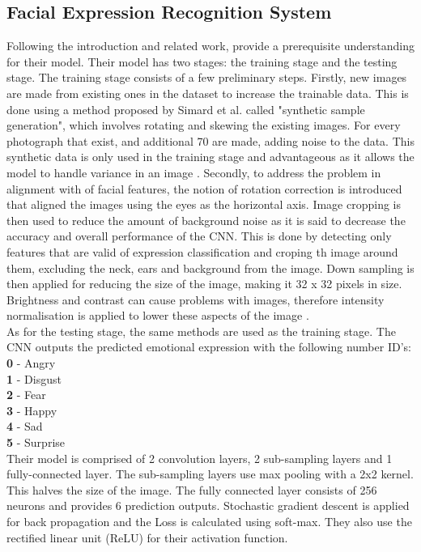 \subsection{Facial Expression Recognition System}
Following the introduction and related work, \citeauthor{LOPES} provide a prerequisite understanding for their model. Their model has two stages: the training stage and the testing stage. The training stage consists of a few preliminary steps. Firstly, new images are made from existing ones in the dataset to increase the trainable data. This is done using a method proposed by Simard et al. called "synthetic sample generation", which involves rotating and skewing the existing images. For every photograph that exist, and additional 70 are made, adding noise to the data. This synthetic data is only used in the training stage and advantageous as it allows the model to handle variance in an image \citep{LOPES}. Secondly, to address the problem in alignment with of facial features, the notion of rotation correction is introduced that aligned the images using the eyes as the horizontal axis. Image cropping is then used to reduce the amount of background noise as it is said to decrease the accuracy and overall performance of the CNN. This is done by detecting only features that are valid of expression classification and croping th image around them, excluding the neck, ears and background from the image.
Down sampling is then applied for reducing the size of the image, making it 32 x 32 pixels in size. Brightness and contrast can cause problems with images, therefore intensity normalisation is applied to lower these aspects of the image \citep{LOPES}. \\
As for the testing stage, the same methods are used as the training stage. The CNN outputs the predicted emotional expression with the following number ID's:\\
\textbf{0} - Angry\\
\textbf{1} - Disgust\\
\textbf{2} - Fear\\
\textbf{3} - Happy\\
\textbf{4} - Sad\\
\textbf{5} - Surprise\\

Their model is comprised of 2 convolution layers, 2 sub-sampling layers and 1 fully-connected layer. The sub-sampling layers use max pooling with a 2x2 kernel. This halves the size of the image. The fully connected layer consists of 256 neurons and provides 6 prediction outputs. Stochastic gradient descent is applied for back propagation and the Loss is calculated using soft-max. They also use the rectified linear unit (ReLU) for their activation function.

